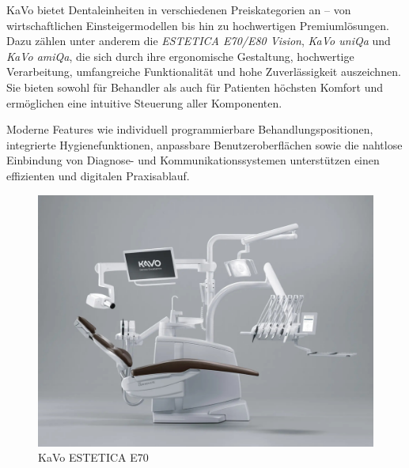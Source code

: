 KaVo bietet Dentaleinheiten in verschiedenen Preiskategorien an – von wirtschaftlichen Einsteigermodellen bis hin zu hochwertigen Premiumlösungen. Dazu zählen unter anderem die \textit{ESTETICA E70/E80 Vision}, \textit{KaVo uniQa} und \textit{KaVo amiQa}, die sich durch ihre ergonomische Gestaltung, hochwertige Verarbeitung, umfangreiche Funktionalität und hohe Zuverlässigkeit auszeichnen. Sie bieten sowohl für Behandler als auch für Patienten höchsten Komfort und ermöglichen eine intuitive Steuerung aller Komponenten.

Moderne Features wie individuell programmierbare Behandlungspositionen, integrierte Hygienefunktionen, anpassbare Benutzeroberflächen sowie die nahtlose Einbindung von Diagnose- und Kommunikationssystemen unterstützen einen effizienten und digitalen Praxisablauf.
\vspace{1em}
\begin{figure}[H]
  \centering
  \begin{minipage}[b]{0.55\textwidth}
    \centering
    \includegraphics[width=\textwidth]{images/ESTETICA-E70-E80-S-coffeel-ProXam-front_3500px.jpg}
    
  \end{minipage}
  \hspace{0.05\textwidth}
  \caption{KaVo ESTETICA E70}
  \label{fig:Scaler und Spitzen}
\end{figure}
\vspace{1em}
